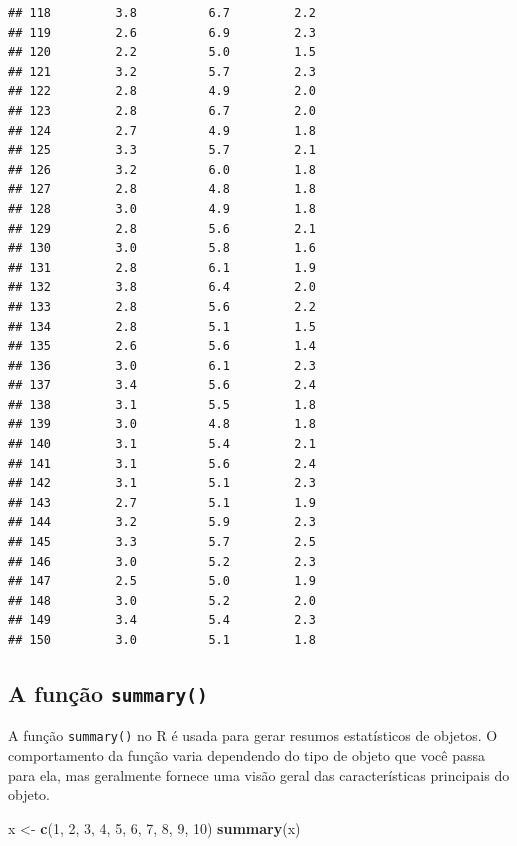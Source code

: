 \documentclass[
]{book}
\newenvironment{Shaded}{\begin{snugshade}}{\end{snugshade}}
\newcommand{\DecValTok}[1]{\textcolor[rgb]{0.00,0.00,0.81}{#1}}
\newcommand{\FunctionTok}[1]{\textcolor[rgb]{0.13,0.29,0.53}{\textbf{#1}}}
\newcommand{\NormalTok}[1]{#1}
\newcommand{\OtherTok}[1]{\textcolor[rgb]{0.56,0.35,0.01}{#1}}
\begin{document}
\begin{verbatim}
## 118         3.8          6.7         2.2
## 119         2.6          6.9         2.3
## 120         2.2          5.0         1.5
## 121         3.2          5.7         2.3
## 122         2.8          4.9         2.0
## 123         2.8          6.7         2.0
## 124         2.7          4.9         1.8
## 125         3.3          5.7         2.1
## 126         3.2          6.0         1.8
## 127         2.8          4.8         1.8
## 128         3.0          4.9         1.8
## 129         2.8          5.6         2.1
## 130         3.0          5.8         1.6
## 131         2.8          6.1         1.9
## 132         3.8          6.4         2.0
## 133         2.8          5.6         2.2
## 134         2.8          5.1         1.5
## 135         2.6          5.6         1.4
## 136         3.0          6.1         2.3
## 137         3.4          5.6         2.4
## 138         3.1          5.5         1.8
## 139         3.0          4.8         1.8
## 140         3.1          5.4         2.1
## 141         3.1          5.6         2.4
## 142         3.1          5.1         2.3
## 143         2.7          5.1         1.9
## 144         3.2          5.9         2.3
## 145         3.3          5.7         2.5
## 146         3.0          5.2         2.3
## 147         2.5          5.0         1.9
## 148         3.0          5.2         2.0
## 149         3.4          5.4         2.3
## 150         3.0          5.1         1.8
\end{verbatim}

\subsection{\texorpdfstring{A função \texttt{summary()}}{A função summary()}}\label{a-funuxe7uxe3o-summary}

A função \texttt{summary()} no R é usada para gerar resumos estatísticos de objetos. O comportamento da função varia dependendo do tipo de objeto que você passa para ela, mas geralmente fornece uma visão geral das características principais do objeto.

\begin{Shaded}
\begin{Highlighting}[]
\NormalTok{x }\OtherTok{\textless{}{-}} \FunctionTok{c}\NormalTok{(}\DecValTok{1}\NormalTok{, }\DecValTok{2}\NormalTok{, }\DecValTok{3}\NormalTok{, }\DecValTok{4}\NormalTok{, }\DecValTok{5}\NormalTok{, }\DecValTok{6}\NormalTok{, }\DecValTok{7}\NormalTok{, }\DecValTok{8}\NormalTok{, }\DecValTok{9}\NormalTok{, }\DecValTok{10}\NormalTok{)}
\FunctionTok{summary}\NormalTok{(x)  }
\end{Highlighting}
\end{Shaded}
\end{document}
